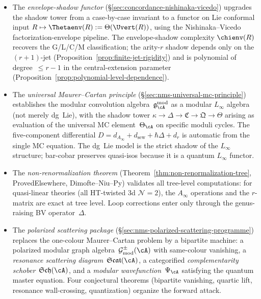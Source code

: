 \begin{itemize}
  The Virasoro quartic contact coefficient
  $Q^{\mathrm{contact}}_{\mathrm{Vir}} = 10/[c(5c+22)]$
  and the genus-$1$ loop ratio
  $\rho^{(1)}_{\mathrm{Vir}} = 240/[c^3(5c+22)]$ are the first
  non-scalar Ring~2 invariants extracted in closed form.
\item The \emph{envelope-shadow functor}
  (\S\ref{sec:concordance-nishinaka-vicedo}) upgrades the shadow
  tower from a case-by-case invariant to a functor on Lie conformal
  input $R \mapsto \Thetaenv(R) := \Theta(\Uvert(R))$, using the
  Nishinaka--Vicedo factorization-envelope pipeline.  The
  envelope-shadow complexity $\chienv(R)$ recovers the
  G/L/C/M classification; the arity-$r$ shadow depends only on
  the $(r{+}1)$-jet (Proposition~\ref{prop:finite-jet-rigidity})
  and is polynomial of degree~$\leq r{-}1$ in the
  central-extension parameter
  (Proposition~\ref{prop:polynomial-level-dependence}).
\item The \emph{universal Maurer--Cartan principle}
  (\S\ref{sec:nms-universal-mc-principle}) establishes the modular
  convolution algebra~$\mathfrak{g}_\cA^{\mathrm{mod}}$ as a modular
  $L_\infty$ algebra (not merely dg~Lie), with the shadow tower
  $\kappa \to \Delta \to \mathfrak{C} \to \mathfrak{Q} \to \Theta$
  arising as evaluation of the universal MC element~$\Theta_\cA$
  on specific moduli cycles.  The five-component differential
  $D = d_{A_\infty} + d_{\mathrm{sew}} + \hbar\Delta + d_r$
  is automatic from the single MC equation.  The dg~Lie model
  is the strict shadow of the $L_\infty$ structure; bar-cobar
  preserves quasi-isos because it is a quantum $L_\infty$ functor.
\item The \emph{non-renormalization theorem}
  (Theorem~\ref{thm:non-renormalization-tree}, ProvedElsewhere,
  Dimofte--Niu--Py) validates all tree-level computations: for
  quasi-linear theories (all HT-twisted 3d $\mathcal{N}=2$), the
  $A_\infty$ operations and the $r$-matrix are exact at tree level.
  Loop corrections enter only through the genus-raising BV
  operator~$\Delta$.
\item The \emph{polarized scattering package}
  (\S\ref{sec:nms-polarized-scattering-programme}) replaces the
  one-colour Maurer--Cartan problem by a bipartite machine:
  a polarized modular graph
  algebra~$\mathcal{G}^{\pm}_{\mathrm{mod}}(\cA)$ with
  same-colour vanishing, a \emph{resonance scattering
  diagram}~$\mathfrak{Scat}(\cA)$, a categorified
  \emph{complementarity schober}~$\mathfrak{Sch}(\cA)$, and a
  \emph{modular wavefunction}~$\Psi_\cA$ satisfying the quantum
  master equation.  Four conjectural theorems (bipartite
  vanishing, quartic lift, resonance wall-crossing, quantization)
  organize the forward attack.
\end{itemize}

